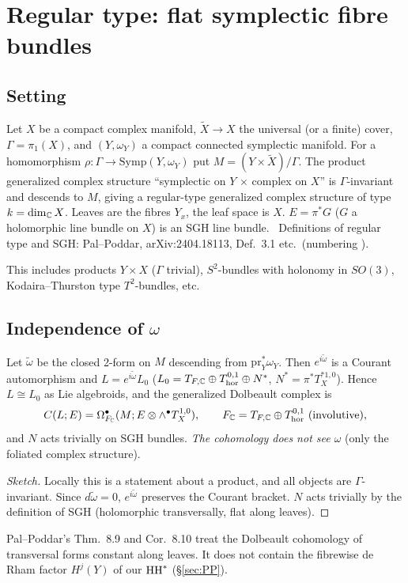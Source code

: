 \section{Regular type: flat symplectic fibre bundles}\label{sec:regular}
\subsection{Setting}\label{sec:setting}
\begin{defn}[Setting (S)]
Let $X$ be a compact complex manifold, $\tilde X\to X$ the universal (or a finite) cover, $\Gamma=\pi_1(X)$, and $(Y,\omega_Y)$ a compact connected symplectic manifold. For a homomorphism $\rho:\Gamma\to\mathrm{Symp}(Y,\omega_Y)$ put $M=(Y\times\tilde X)/\Gamma$. The product generalized complex structure ``symplectic on $Y$ $\times$ complex on $X$'' is $\Gamma$-invariant and descends to $M$, giving a regular-type generalized complex structure of type $k=\dim_\mathbb C X$. Leaves are the fibres $Y_x$, the leaf space is $X$. $E=\pi^*G$ ($G$ a holomorphic line bundle on $X$) is an SGH line bundle. \tC\ Definitions of regular type and SGH: Pal--Poddar, arXiv:2404.18113, Def.\ 3.1 etc.\ (numbering \tQ).
\end{defn}
\noindent This includes products $Y\times X$ ($\Gamma$ trivial), $S^2$-bundles with holonomy in $SO(3)$, Kodaira--Thurston type $T^2$-bundles, etc.

\subsection{Independence of $\omega$}
\begin{prop}\tP\label{prop:L1}
Let $\tilde\omega$ be the closed 2-form on $M$ descending from $\mathrm{pr}_Y^*\omega_Y$. Then $e^{i\tilde\omega}$ is a Courant automorphism and $L=e^{i\tilde\omega}L_0$ ($L_0=T_{F,\mathbb C}\oplus T^{0,1}_{\mathrm{hor}}\oplus N^*$, $N^*=\pi^*T^{*1,0}_X$). Hence $L\cong L_0$ as Lie algebroids, and the generalized Dolbeault complex is
\[C(L;E)=\Omega^\bullet_{F_\C}(M;E\otimes\wedge^\bullet T^{1,0}_X),\qquad F_\C=T_{F,\C}\oplus T^{0,1}_{\mathrm{hor}}\ (\text{involutive}),\]
and $N$ acts trivially on SGH bundles. \emph{The cohomology does not see $\omega$} (only the foliated complex structure).
\end{prop}
\begin{proof}[Sketch]
Locally this is a statement about a product, and all objects are $\Gamma$-invariant. Since $d\tilde\omega=0$, $e^{i\tilde\omega}$ preserves the Courant bracket. $N$ acts trivially by the definition of SGH (holomorphic transversally, flat along leaves).\qedhere
\end{proof}
\begin{rem}\tC\tQ
Pal--Poddar's Thm.\ 8.9 and Cor.\ 8.10 treat the Dolbeault cohomology of transversal forms constant along leaves. It does not contain the fibrewise de Rham factor $H^j(Y)$ of our $\mathrm{HH}^*$ (\S\ref{sec:PP}).
\end{rem}


